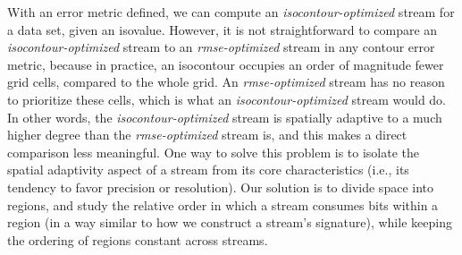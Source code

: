 With an error metric defined, we can compute an \emph{isocontour-optimized} stream for a data set,
given an isovalue. However, it is not straightforward to compare an \emph{isocontour-optimized}
stream to an \emph{rmse-optimized} stream in any contour error metric, because in practice, an
isocontour occupies an order of magnitude fewer grid cells, compared to the whole grid. An
\emph{rmse-optimized} stream has no reason to prioritize these cells, which is what an
\emph{isocontour-optimized} stream would do. In other words, the \emph{isocontour-optimized} stream
is spatially adaptive to a much higher degree than the \emph{rmse-optimized} stream is, and this
makes a direct comparison less meaningful. One way to solve this problem is to isolate the spatial
adaptivity aspect of a stream from its core characteristics (i.e., its tendency to favor precision
or resolution). Our solution is to divide space into regions, and study the relative order in which
a stream consumes bits within a region (in a way similar to how we construct a stream's signature),
while keeping the ordering of regions constant across streams.


